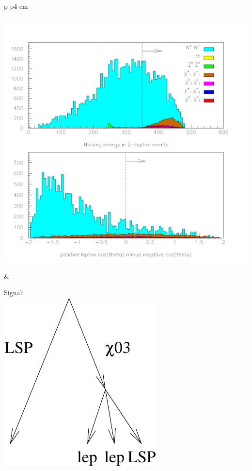 \documentclass[landscape]{article}
\begin{document}
\LARGE
\renewcommand{\labelitemi}{-}
\setlength{\parindent}{0 cm}

\begin{center} \begin{tabular}{p{\textheight} p{4 cm}}
    \begin{minipage}{\linewidth}
      \includegraphics[width=\linewidth]{two_leptons_1.pdf}
    \end{minipage} &
    \begin{minipage}{\linewidth}
      Signal: \\
      \includegraphics[width=\linewidth]{two_leptons_signal.pdf}


\end{minipage}
\end{tabular}
\end{center}
\end{document}
